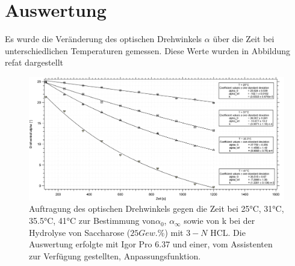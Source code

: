 


\section{Auswertung}

Es wurde die Veränderung des optischen Drehwinkels $\alpha$ über die Zeit bei unterschiedlichen Temperaturen gemessen. Diese Werte wurden in Abbildung ref{at} dargestellt


\begin{figure}[h]
	\centering	
	\begin{minipage}{1\textwidth}
	\includegraphics[width=\columnwidth]{Bilder/Graph1.png}
	\end{minipage}
		\caption{Auftragung des optischen Drehwinkels gegen die Zeit bei 25°C, 31°C, 35.5°C, 41°C zur Bestimmung von$\alpha_0$, $\alpha_\infty$ sowie von k bei der Hydrolyse von Saccharose ($25 Gew.\%$) mit $3-N$ HCL. Die Auswertung erfolgte mit Igor Pro 6.37 und einer, vom Assistenten zur Verfügung gestellten, Anpassungsfunktion.}
	\label{at}
\end{figure}


